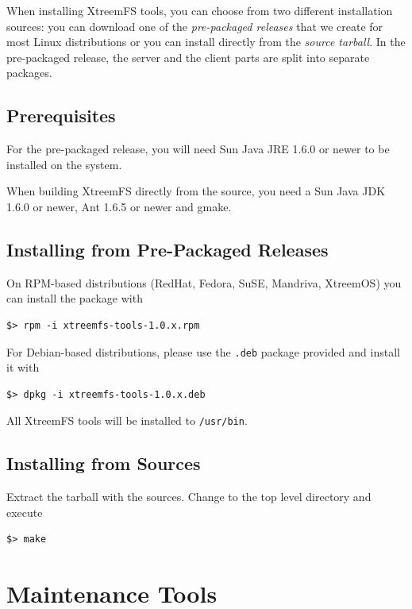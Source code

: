 \documentclass[a4paper,10pt]{book}
\begin{document}
When installing XtreemFS tools, you can choose from two different installation sources: you can download one of the \emph{pre-packaged releases} that we create for most Linux distributions or you can install directly from the \emph{source tarball}. In the pre-packaged release, the server and the client parts are split into separate packages.

\subsection{Prerequisites}

For the pre-packaged release, you will need Sun Java JRE 1.6.0 or newer to be installed on the system.

When building XtreemFS directly from the source, you need a Sun Java JDK 1.6.0 or newer, Ant 1.6.5 or newer and gmake.

\subsection{Installing from Pre-Packaged Releases}

On RPM-based distributions (RedHat, Fedora, SuSE, Mandriva, XtreemOS) you can install the package with


\begin{verbatim}
$> rpm -i xtreemfs-tools-1.0.x.rpm
\end{verbatim}


For Debian-based distributions, please use the \texttt{.deb} package provided and install it with


\begin{verbatim}
$> dpkg -i xtreemfs-tools-1.0.x.deb
\end{verbatim}


All XtreemFS tools will be installed to \texttt{/usr/bin}.

\subsection{Installing from Sources}

Extract the tarball with the sources. Change to the top level directory and execute


\begin{verbatim}
$> make
\end{verbatim}

\section{Maintenance Tools}
\end{document}
